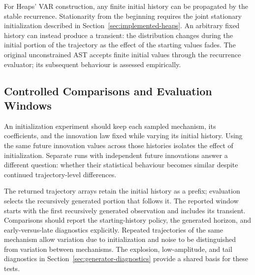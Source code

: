 For Heaps' VAR construction, any finite initial history can be propagated by
the stable recurrence. Stationarity from the beginning requires the joint
stationary initialization described in Section~\ref{sec:implemented-heaps}.
An arbitrary fixed history can instead produce a transient: the distribution
changes during the initial portion of the trajectory as the effect of the
starting values fades. The original unconstrained AST accepts finite initial
values through the recurrence evaluator; its subsequent behaviour is assessed
empirically.

\subsection{Controlled Comparisons and Evaluation Windows}
An initialization experiment should keep each sampled mechanism, its
coefficients, and the innovation law fixed while varying its initial history.
Using the same future innovation values across those histories isolates the
effect of initialization. Separate runs with independent future innovations
answer a different question: whether their statistical behaviour becomes
similar despite continued trajectory-level differences.

The returned trajectory arrays retain the initial history as a prefix;
evaluation selects the recursively generated portion that follows it.
The reported window starts with the first recursively generated
observation and includes its transient. Comparisons should report the
starting-history policy, the generated horizon, and early-versus-late
diagnostics explicitly. Repeated trajectories of the same mechanism allow
variation due to initialization and noise to be distinguished from variation
between mechanisms. The explosion, low-amplitude, and tail diagnostics in
Section~\ref{sec:generator-diagnostics} provide a shared basis for these tests.

